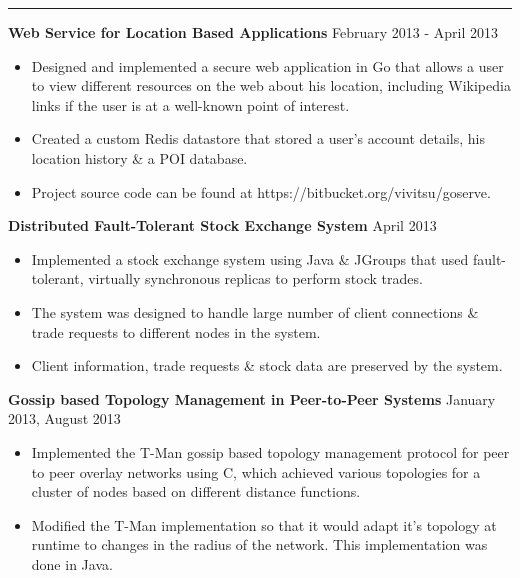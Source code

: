 \documentclass[10pt, a4paper]{article}
\begin{document}
\smallskip
\hrule
{\bf Web Service for Location Based Applications} \hfill February 2013 - April 2013
\begin{itemize}
    \item Designed and implemented a secure web application in Go that allows a user to view different resources on the web about his location, including Wikipedia links if the user is at a well-known point of interest.
    \item Created a custom Redis datastore that stored a user's account details, his location history \& a POI database.
    \item Project source code can be found at https://bitbucket.org/vivitsu/goserve.
\end{itemize}

{\bf Distributed Fault-Tolerant Stock Exchange System} \hfill April 2013
\begin{itemize}
    \item Implemented a stock exchange system using Java \& JGroups that used fault-tolerant, virtually synchronous replicas to perform stock trades.
    \item The system was designed to handle large number of client connections \& trade requests to different nodes in the system.
    \item Client information, trade requests \& stock data are preserved by the system. %
\end{itemize}
{\bf Gossip based Topology Management in Peer-to-Peer Systems} \hfill January 2013, August 2013
\begin{itemize}
    \item Implemented the T-Man gossip based topology management protocol for peer to peer overlay networks using C, which achieved various topologies for a cluster of nodes based on different distance functions.
    \item Modified the T-Man implementation so that it would adapt it's topology at runtime to changes in the radius of the network. This implementation was done in Java. %
\end{itemize}
\end{document}
